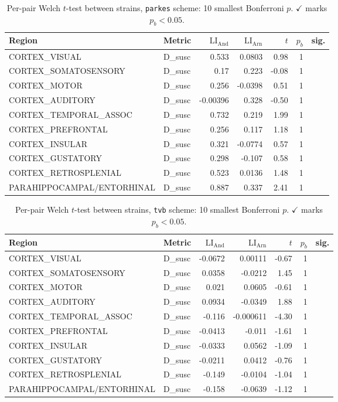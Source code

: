 \begin{table}[H]\centering\small
\caption{Per-pair Welch $t$-test between strains, \texttt{parkes} scheme: 10 smallest Bonferroni $p$. $\checkmark$ marks $p_b<0.05$.}
\begin{tabular}{@{}llrrrrc@{}}\toprule
Region & Metric & $\mathrm{LI}_{\mathrm{And}}$ & $\mathrm{LI}_{\mathrm{Arn}}$ & $t$ & $p_b$ & sig. \\\midrule
CORTEX\_VISUAL & D\_susc & 0.533 & 0.0803 & 0.98 & 1 &  \\
CORTEX\_SOMATOSENSORY & D\_susc & 0.17 & 0.223 & -0.08 & 1 &  \\
CORTEX\_MOTOR & D\_susc & 0.256 & -0.0398 & 0.51 & 1 &  \\
CORTEX\_AUDITORY & D\_susc & -0.00396 & 0.328 & -0.50 & 1 &  \\
CORTEX\_TEMPORAL\_ASSOC & D\_susc & 0.732 & 0.219 & 1.99 & 1 &  \\
CORTEX\_PREFRONTAL & D\_susc & 0.256 & 0.117 & 1.18 & 1 &  \\
CORTEX\_INSULAR & D\_susc & 0.321 & -0.0774 & 0.57 & 1 &  \\
CORTEX\_GUSTATORY & D\_susc & 0.298 & -0.107 & 0.58 & 1 &  \\
CORTEX\_RETROSPLENIAL & D\_susc & 0.523 & 0.0136 & 1.48 & 1 &  \\
PARAHIPPOCAMPAL/ENTORHINAL & D\_susc & 0.887 & 0.337 & 2.41 & 1 &  \\
\bottomrule\end{tabular}\end{table}
\begin{table}[H]\centering\small
\caption{Per-pair Welch $t$-test between strains, \texttt{tvb} scheme: 10 smallest Bonferroni $p$. $\checkmark$ marks $p_b<0.05$.}
\begin{tabular}{@{}llrrrrc@{}}\toprule
Region & Metric & $\mathrm{LI}_{\mathrm{And}}$ & $\mathrm{LI}_{\mathrm{Arn}}$ & $t$ & $p_b$ & sig. \\\midrule
CORTEX\_VISUAL & D\_susc & -0.0672 & 0.00111 & -0.67 & 1 &  \\
CORTEX\_SOMATOSENSORY & D\_susc & 0.0358 & -0.0212 & 1.45 & 1 &  \\
CORTEX\_MOTOR & D\_susc & 0.021 & 0.0605 & -0.61 & 1 &  \\
CORTEX\_AUDITORY & D\_susc & 0.0934 & -0.0349 & 1.88 & 1 &  \\
CORTEX\_TEMPORAL\_ASSOC & D\_susc & -0.116 & -0.000611 & -4.30 & 1 &  \\
CORTEX\_PREFRONTAL & D\_susc & -0.0413 & -0.011 & -1.61 & 1 &  \\
CORTEX\_INSULAR & D\_susc & -0.0333 & 0.0562 & -1.09 & 1 &  \\
CORTEX\_GUSTATORY & D\_susc & -0.0211 & 0.0412 & -0.76 & 1 &  \\
CORTEX\_RETROSPLENIAL & D\_susc & -0.149 & -0.0104 & -1.04 & 1 &  \\
PARAHIPPOCAMPAL/ENTORHINAL & D\_susc & -0.158 & -0.0639 & -1.12 & 1 &  \\
\bottomrule\end{tabular}\end{table}

